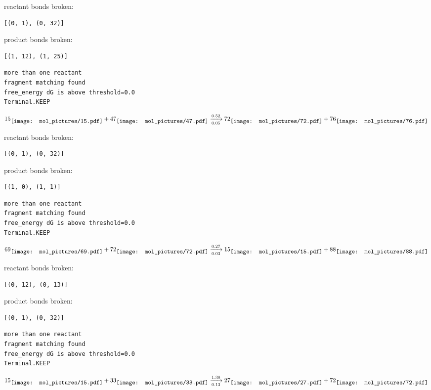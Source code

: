 \documentclass{article}
\begin{document}
reactant bonds broken:\begin{verbatim}
[(0, 1), (0, 32)]
\end{verbatim}
product bonds broken:\begin{verbatim}
[(1, 12), (1, 25)]
\end{verbatim}




\vspace{1cm}
\begin{verbatim}
more than one reactant
fragment matching found
free_energy dG is above threshold=0.0
Terminal.KEEP
\end{verbatim}
$$
15
\raisebox{-.5\height}{\texttt{[image: mol\_pictures/15.pdf]}}
+
47
\raisebox{-.5\height}{\texttt{[image: mol\_pictures/47.pdf]}}
\xrightarrow[0.05]{0.52}
72
\raisebox{-.5\height}{\texttt{[image: mol\_pictures/72.pdf]}}
+
76
\raisebox{-.5\height}{\texttt{[image: mol\_pictures/76.pdf]}}
$$


reactant bonds broken:\begin{verbatim}
[(0, 1), (0, 32)]
\end{verbatim}
product bonds broken:\begin{verbatim}
[(1, 0), (1, 1)]
\end{verbatim}




\vspace{1cm}
\begin{verbatim}
more than one reactant
fragment matching found
free_energy dG is above threshold=0.0
Terminal.KEEP
\end{verbatim}
$$
69
\raisebox{-.5\height}{\texttt{[image: mol\_pictures/69.pdf]}}
+
72
\raisebox{-.5\height}{\texttt{[image: mol\_pictures/72.pdf]}}
\xrightarrow[0.03]{0.27}
15
\raisebox{-.5\height}{\texttt{[image: mol\_pictures/15.pdf]}}
+
88
\raisebox{-.5\height}{\texttt{[image: mol\_pictures/88.pdf]}}
$$


reactant bonds broken:\begin{verbatim}
[(0, 12), (0, 13)]
\end{verbatim}
product bonds broken:\begin{verbatim}
[(0, 1), (0, 32)]
\end{verbatim}




\vspace{1cm}
\begin{verbatim}
more than one reactant
fragment matching found
free_energy dG is above threshold=0.0
Terminal.KEEP
\end{verbatim}
$$
15
\raisebox{-.5\height}{\texttt{[image: mol\_pictures/15.pdf]}}
+
33
\raisebox{-.5\height}{\texttt{[image: mol\_pictures/33.pdf]}}
\xrightarrow[0.13]{1.30}
27
\raisebox{-.5\height}{\texttt{[image: mol\_pictures/27.pdf]}}
+
72
\raisebox{-.5\height}{\texttt{[image: mol\_pictures/72.pdf]}}
$$
\end{document}
